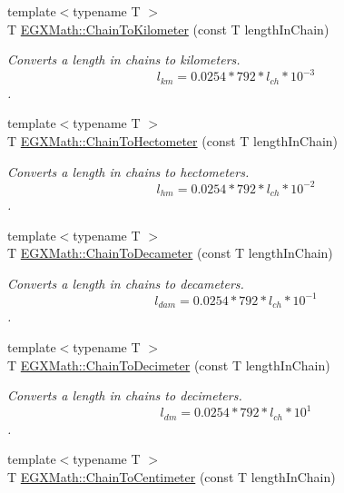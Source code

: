 \begin{DoxyCompactItemize}
{\footnotesize template$<$typename T $>$ }\\T \mbox{\hyperlink{group___e_g_x_math-_conversions-_length_conversions-_surveyors-_chain-_s_i_ga4fd4349867e45ce387c01403b8dcf426}{E\+G\+X\+Math\+::\+Chain\+To\+Kilometer}} (const T length\+In\+Chain)
\begin{DoxyCompactList}\small\item\em Converts a length in chains to kilometers. \[ l_{km}=0.0254 * 792 * l_{ch} * 10^{-3} \]. \end{DoxyCompactList}\item 
{\footnotesize template$<$typename T $>$ }\\T \mbox{\hyperlink{group___e_g_x_math-_conversions-_length_conversions-_surveyors-_chain-_s_i_ga306a29ba8425ed22c19171e718d42f20}{E\+G\+X\+Math\+::\+Chain\+To\+Hectometer}} (const T length\+In\+Chain)
\begin{DoxyCompactList}\small\item\em Converts a length in chains to hectometers. \[ l_{hm}=0.0254 * 792 * l_{ch} * 10^{-2} \]. \end{DoxyCompactList}\item 
{\footnotesize template$<$typename T $>$ }\\T \mbox{\hyperlink{group___e_g_x_math-_conversions-_length_conversions-_surveyors-_chain-_s_i_gaabde0350f3af15795de0adeac2ec9e28}{E\+G\+X\+Math\+::\+Chain\+To\+Decameter}} (const T length\+In\+Chain)
\begin{DoxyCompactList}\small\item\em Converts a length in chains to decameters. \[ l_{dam}=0.0254 * 792 * l_{ch} * 10^{-1} \]. \end{DoxyCompactList}\item 
{\footnotesize template$<$typename T $>$ }\\T \mbox{\hyperlink{group___e_g_x_math-_conversions-_length_conversions-_surveyors-_chain-_s_i_ga9311e5452f0bd1f79f95e43085ad6412}{E\+G\+X\+Math\+::\+Chain\+To\+Decimeter}} (const T length\+In\+Chain)
\begin{DoxyCompactList}\small\item\em Converts a length in chains to decimeters. \[ l_{dm}=0.0254 * 792 * l_{ch} * 10^{1} \]. \end{DoxyCompactList}\item 
{\footnotesize template$<$typename T $>$ }\\T \mbox{\hyperlink{group___e_g_x_math-_conversions-_length_conversions-_surveyors-_chain-_s_i_ga33a053c1566c1371a9ac3a5ce66340bf}{E\+G\+X\+Math\+::\+Chain\+To\+Centimeter}} (const T length\+In\+Chain)

\end{DoxyCompactItemize}
